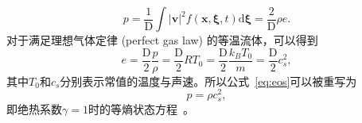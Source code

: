 \begin{equation}
    p=\frac{1}{\mathrm{D}} \int|\boldsymbol{v}|^2 f(\boldsymbol{x}, \boldsymbol{\xi}, t) \mathrm{d} \boldsymbol{\xi}=\frac{2}{\mathrm{D}} \rho e.
    \label{eq:eos}
\end{equation}
对于满足理想气体定律 (perfect gas law) 的等温流体，可以得到
\begin{equation}
    e=\frac{\mathrm{D}}{2} \frac{p}{\rho}=\frac{\mathrm{D}}{2} R T_0=\frac{\mathrm{D}}{2} \frac{k_B T_0}{m}=\frac{\mathrm{D}}{2} c_s^2,
\end{equation}
其中$T_0$和$c_s$分别表示常值的温度与声速。所以公式~\ref{eq:eos}可以被重写为
\begin{equation}
    p=\rho c_s^2,
\end{equation}
即绝热系数$\gamma=1$时的等熵状态方程~\cite{kundu2015fluid}。


